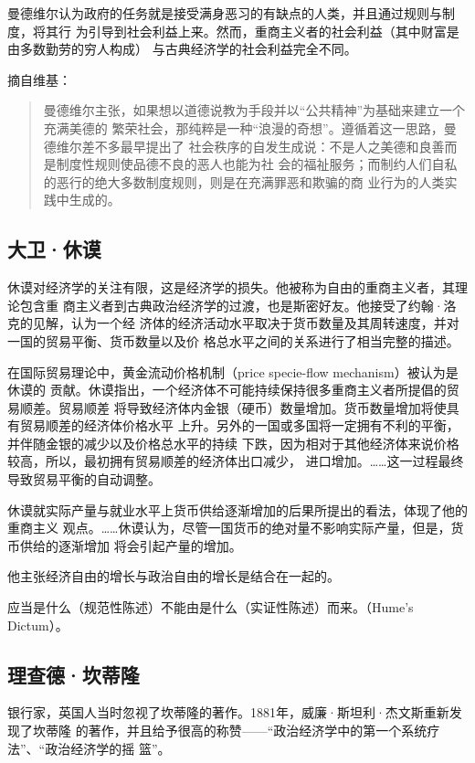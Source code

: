 曼德维尔认为政府的任务就是接受满身恶习的有缺点的人类，并且通过规则与制度，将其行
为引导到社会利益上来。然而，重商主义者的社会利益（其中财富是由多数勤劳的穷人构成）
与古典经济学的社会利益完全不同。

摘自维基：
\begin{quotation}
  曼德维尔主张，如果想以道德说教为手段并以“公共精神”为基础来建立一个充满美德的
  繁荣社会，那纯粹是一种“浪漫的奇想”。遵循着这一思路，曼德维尔差不多最早提出了
  社会秩序的自发生成说：不是人之美德和良善而是制度性规则使品德不良的恶人也能为社
  会的福祉服务；而制约人们自私的恶行的绝大多数制度规则，则是在充满罪恶和欺骗的商
  业行为的人类实践中生成的。
\end{quotation}

\subsection{大卫·休谟}

休谟对经济学的关注有限，这是经济学的损失。他被称为自由的重商主义者，其理论包含重
商主义者到古典政治经济学的过渡，也是斯密好友。他接受了约翰·洛克的见解，认为一个经
济体的经济活动水平取决于货币数量及其周转速度，并对一国的贸易平衡、货币数量以及价
格总水平之间的关系进行了相当完整的描述。

在国际贸易理论中，黄金流动价格机制（price specie-flow mechanism）被认为是休谟的
贡献。休谟指出，一个经济体不可能持续保持很多重商主义者所提倡的贸易顺差。贸易顺差
将导致经济体内金银（硬币）数量增加。货币数量增加将使具有贸易顺差的经济体价格水平
上升。另外的一国或多国将一定拥有不利的平衡，并伴随金银的减少以及价格总水平的持续
下跌，因为相对于其他经济体来说价格较高，所以，最初拥有贸易顺差的经济体出口减少，
进口增加。……这一过程最终导致贸易平衡的自动调整。

休谟就实际产量与就业水平上货币供给逐渐增加的后果所提出的看法，体现了他的重商主义
观点。……休谟认为，尽管一国货币的绝对量不影响实际产量，但是，货币供给的逐渐增加
将会引起产量的增加。

他主张经济自由的增长与政治自由的增长是结合在一起的。

应当是什么（规范性陈述）不能由是什么（实证性陈述）而来。（Hume's Dictum）。

\subsection{理查德·坎蒂隆}

银行家，英国人当时忽视了坎蒂隆的著作。1881年，威廉·斯坦利·杰文斯重新发现了坎蒂隆
的著作，并且给予很高的称赞——“政治经济学中的第一个系统疗法”、“政治经济学的摇
篮”。

